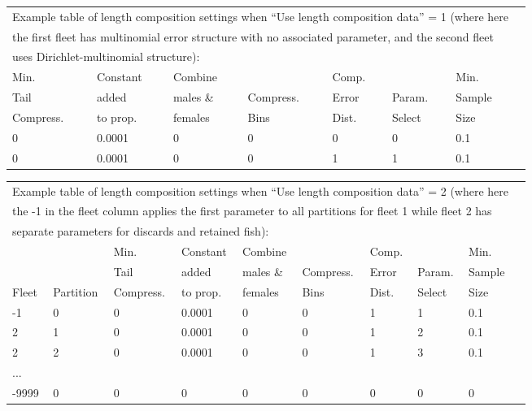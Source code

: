 \begin{tabular}{p{2cm} p{2cm} p{2cm} p{2cm} p{2cm} p{2cm} p{1.5cm} p{1.7cm}}
	\multicolumn{7}{l}{Example table of length composition settings when ``Use length composition data'' = 1 (where here }\\
	\multicolumn{7}{l}{the first fleet has multinomial error structure with no associated parameter, and the second fleet}\\ 
	\multicolumn{7}{l}{uses Dirichlet-multinomial structure):}\\
	\hline
	Min.      & Constant & Combine   &           & Comp. &           & Min.\Tstrut\\
	Tail      & added    & males \&  & Compress. & Error & Param.    & Sample\\
	Compress. & to prop. & females   & Bins      & Dist. & Select    & Size\Bstrut\\
	\hline
	0 & 0.0001 & 0 & 0 & 0 & 0 & 0.1 \Tstrut\\
	0 & 0.0001 & 0 & 0 & 1 & 1 & 0.1 \Bstrut\\
	\hline
\end{tabular}


\begin{tabular}{p{1cm} p{1.5cm} p{1.5cm} p{1.5cm} p{1.5cm} p{1.5cm} p{1.5cm} p{1.5cm} p{1.5cm} p{1.5cm}}
		\multicolumn{9}{l}{Example table of length composition settings when ``Use length composition data'' = 2 (where here}\\
		\multicolumn{9}{l}{the -1 in the fleet column applies the first parameter to all partitions for fleet 1 while fleet 2 has}\\
		\multicolumn{9}{l}{separate parameters for discards and retained fish):}\\
		\hline
		          &           & Min.      & Constant & Combine   &           & Comp. &           & Min.\Tstrut\\
		          &           & Tail      & added    & males \&  & Compress. & Error & Param.    & Sample\\
		Fleet     & Partition & Compress. & to prop. & females   & Bins      & Dist. & Select    & Size\Bstrut\\
		\hline
		-1 & 0 & 0 & 0.0001 & 0 & 0 & 1 & 1 & 0.1 \Tstrut\\
		2 & 1 & 0 & 0.0001 & 0 & 0 & 1 & 2 & 0.1 \\
		2 & 2 & 0 & 0.0001 & 0 & 0 & 1 & 3 & 0.1 \\
		... &  &  &        &   &   &   &   &  \\
		-9999 & 0 & 0 & 0 & 0 & 0 & 0 & 0 & 0 \Bstrut\\
		\hline
\end{tabular}

